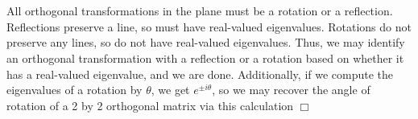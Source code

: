 \documentclass{article}
\begin{document}
\section{}
All orthogonal transformations in the plane must be a rotation or a reflection. Reflections preserve a line, so must have real-valued eigenvalues. Rotations do not preserve any lines, so do not have real-valued eigenvalues. Thus, we may identify an orthogonal transformation with a reflection or a rotation based on whether it has a real-valued eigenvalue, and we are done. Additionally, if we compute the eigenvalues of a rotation by $\theta$, we get $e^{\pm i\theta}$, so we may recover the angle of rotation of a 2 by 2 orthogonal matrix via this calculation $\Box$
\end{document}
